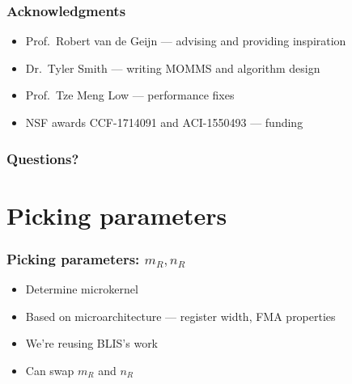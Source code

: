 \documentclass{beamer}
\begin{document}
\begin{frame}
  \frametitle{Acknowledgments}
  \begin{itemize}
  \item Prof.\ Robert van de Geijn --- advising and providing inspiration
  \item Dr.\ Tyler Smith --- writing MOMMS and algorithm design
  \item Prof.\ Tze Meng Low --- performance fixes
  \item NSF awards CCF-1714091 and ACI-1550493 --- funding
  \end{itemize}
\end{frame}

\begin{frame}
  \frametitle{Questions?}
\end{frame}

\section{Picking parameters}
\begin{frame}
  \frametitle{Picking parameters: $m_R, n_R$}
  \begin{itemize}
  \item Determine microkernel
  \item Based on microarchitecture --- register width, FMA properties
  \item We're reusing BLIS's work
  \item Can swap $m_R$ and $n_R$
  \end{itemize}
\end{frame}
\end{document}

